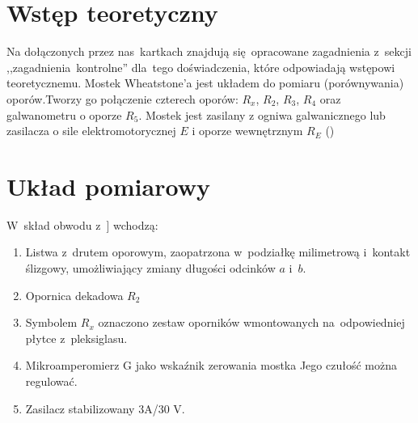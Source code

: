 \documentclass{fizraport}
\begin{document}
\maketitle

\section{Wstęp teoretyczny}
Na dołączonych przez nas~kartkach znajdują się~opracowane zagadnienia z~sekcji \mbox{,,zagadnienia kontrolne''} dla~tego doświadczenia, które odpowiadają wstępowi teoretycznemu.
\newline
\newline
Mostek Wheatstone’a jest układem do pomiaru (porównywania) oporów.Tworzy go
połączenie czterech oporów: $R_x$, $R_2$, $R_3$, $R_4$ oraz galwanometru o oporze $R_5$. Mostek jest zasilany z ogniwa galwanicznego lub zasilacza o sile elektromotorycznej $E$ i oporze wewnętrznym $R_E$ ()
\newpage %
\addtocounter{page}{4}%

\section{Układ pomiarowy}
 W~skład obwodu z~] wchodzą:
\begin{enumerate}
    \item Listwa z~drutem oporowym, zaopatrzona w~podziałkę milimetrową i~kontakt ślizgowy,
umożliwiający zmiany długości odcinków $a$ i~$b$. 
    \item Opornica dekadowa $R_2$
    \item Symbolem $R_x$
 oznaczono zestaw oporników wmontowanych na~odpowiedniej płytce z~pleksiglasu.
    \item Mikroamperomierz G jako wskaźnik zerowania mostka Jego czułość można regulować. 
    \item Zasilacz stabilizowany 3A/30 V. 
\end{enumerate}
\end{document}
